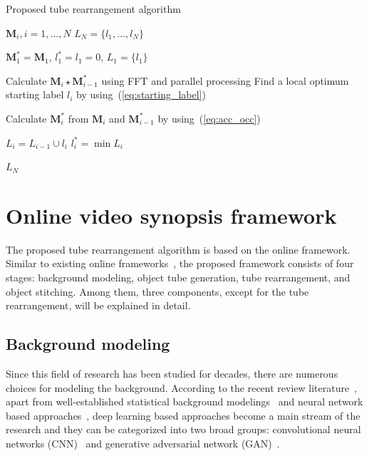 \documentclass[11pt]{hyu_thesis}
\begin{document}
\begin{algorithm}[t]
	\caption{Proposed tube rearrangement algorithm}
	\label{alg:proposed}
	\begin{algorithmic}
		\REQUIRE $\textbf{M}_{i}, i = 1,...,N$
		\ENSURE $L_{N} = \{ l_{1},...,l_{N} \}$
		
		\STATE $\textbf{M}_{1}^{*} = \textbf{M}_{1}$, $l_{1}^{*} = l_{1} = 0$, $L_{1} = \{ l_{1} \}$
		
		\STATE Calculate $\textbf{M}_{i} \star \textbf{M}_{i-1}^{*}$ using FFT and parallel processing
		\STATE Find a local optimum starting label $l_{i}$ by using~(\ref{eq:starting_label})

		\STATE Calculate $\textbf{M}_{i}^{*}$ from $\textbf{M}_{i}$ and $\textbf{M}_{i-1}^{*}$ by using~(\ref{eq:acc_occ})

		\STATE $L_{i} = L_{i-1} \cup l_{i}$
		\STATE $l_{i}^{*} = \min L_{i}$
		\ENDFOR
		
		\RETURN $L_{N}$
	\end{algorithmic}
\end{algorithm}
\chapter{Online video synopsis framework}
\label{sec:framework}
The proposed tube rearrangement algorithm is based on the online framework. Similar to existing online frameworks~\cite{}, the proposed framework consists of four stages: background modeling, object tube generation, tube rearrangement, and object stitching. Among them, three components, except for the tube rearrangement, will be explained in detail.

\section{Background modeling}
Since this field of research has been studied for decades, there are numerous choices for modeling the background. According to the recent review literature~\cite{bouwmans2018deep}, apart from well-established statistical background modelings~\cite{Zivkovic2004,Zivkovic2006,Barnich2009ViBe,Barnich2011ViBe,VanDroogenbroeck2012Background,VanDroogenbroeck2014ViBe,Hofmann2012,Muchtar2018} and neural network based approaches~\cite{maddalena2008self,maddalena2012sobs}, deep learning based approaches become a main stream of the research and they can be categorized into two broad groups: convolutional neural networks (CNN)~\cite{Patil2018,Lim2018} and generative adversarial network (GAN)~\cite{Bakkay2018,Sultana2019,Sakkos2019}.
\end{document}
